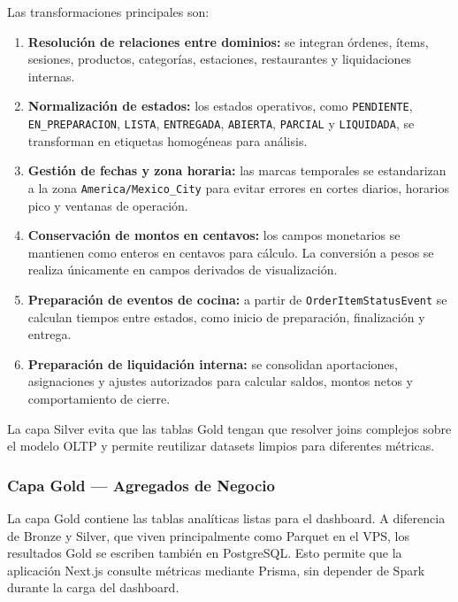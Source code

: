 Las transformaciones principales son:

\begin{enumerate}[leftmargin=1.5em]
  \item \textbf{Resolución de relaciones entre dominios:} se integran órdenes, ítems,
  sesiones, productos, categorías, estaciones, restaurantes y liquidaciones internas.

  \item \textbf{Normalización de estados:} los estados operativos, como
  \texttt{PENDIENTE}, \texttt{EN\_PREPARACION}, \texttt{LISTA}, \texttt{ENTREGADA},
  \texttt{ABIERTA}, \texttt{PARCIAL} y \texttt{LIQUIDADA}, se transforman en etiquetas
  homogéneas para análisis.

  \item \textbf{Gestión de fechas y zona horaria:} las marcas temporales se estandarizan
  a la zona \texttt{America/Mexico\_City} para evitar errores en cortes diarios,
  horarios pico y ventanas de operación.

  \item \textbf{Conservación de montos en centavos:} los campos monetarios se mantienen
  como enteros en centavos para cálculo. La conversión a pesos se realiza únicamente en
  campos derivados de visualización.

  \item \textbf{Preparación de eventos de cocina:} a partir de
  \texttt{OrderItemStatusEvent} se calculan tiempos entre estados, como inicio de
  preparación, finalización y entrega.

  \item \textbf{Preparación de liquidación interna:} se consolidan aportaciones,
  asignaciones y ajustes autorizados para calcular saldos, montos netos y comportamiento
  de cierre.
\end{enumerate}

La capa Silver evita que las tablas Gold tengan que resolver joins complejos sobre el
modelo OLTP y permite reutilizar datasets limpios para diferentes métricas.

\subsubsection{Capa Gold --- Agregados de Negocio}

La capa Gold contiene las tablas analíticas listas para el dashboard. A diferencia de
Bronze y Silver, que viven principalmente como Parquet en el VPS, los resultados Gold se
escriben también en PostgreSQL. Esto permite que la aplicación Next.js consulte métricas
mediante Prisma, sin depender de Spark durante la carga del dashboard.

